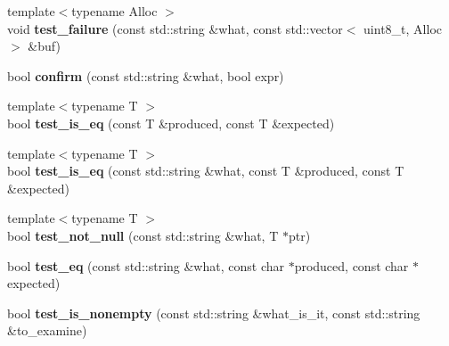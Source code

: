 \begin{DoxyCompactItemize}
\mbox{\label{class_botan___tests_1_1_test_1_1_result_ac49cddc714ebe7666e9f5a1cb12dbb3e}} 
{\footnotesize template$<$typename Alloc $>$ }\\void {\bfseries test\+\_\+failure} (const std\+::string \&what, const std\+::vector$<$ uint8\+\_\+t, Alloc $>$ \&buf)
\item 
\mbox{\label{class_botan___tests_1_1_test_1_1_result_af41391a9c8cce9dcc85d00a787a09abe}} 
bool {\bfseries confirm} (const std\+::string \&what, bool expr)
\item 
\mbox{\label{class_botan___tests_1_1_test_1_1_result_af6b10d1d3eb1cc42eeef3f6613025c3f}} 
{\footnotesize template$<$typename T $>$ }\\bool {\bfseries test\+\_\+is\+\_\+eq} (const T \&produced, const T \&expected)
\item 
\mbox{\label{class_botan___tests_1_1_test_1_1_result_ab6ce1cdad046f4704cfe8c83e936d074}} 
{\footnotesize template$<$typename T $>$ }\\bool {\bfseries test\+\_\+is\+\_\+eq} (const std\+::string \&what, const T \&produced, const T \&expected)
\item 
\mbox{\label{class_botan___tests_1_1_test_1_1_result_a720d4589cc42dd403066fc523fd13658}} 
{\footnotesize template$<$typename T $>$ }\\bool {\bfseries test\+\_\+not\+\_\+null} (const std\+::string \&what, T $\ast$ptr)
\item 
\mbox{\label{class_botan___tests_1_1_test_1_1_result_acc4aabc7a1c865f855544d69743874d1}} 
bool {\bfseries test\+\_\+eq} (const std\+::string \&what, const char $\ast$produced, const char $\ast$expected)
\item 
\mbox{\label{class_botan___tests_1_1_test_1_1_result_a1b0ca46ae14c41e23b486a6423627cde}} 
bool {\bfseries test\+\_\+is\+\_\+nonempty} (const std\+::string \&what\+\_\+is\+\_\+it, const std\+::string \&to\+\_\+examine)
\item 

\end{DoxyCompactItemize}
